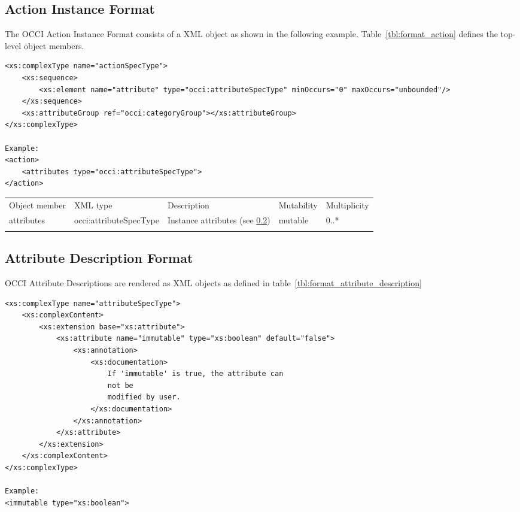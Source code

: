 \documentclass[10pt,a4paper]{article}
\begin{document}
\subsection{Action Instance Format}
\label{sec:format_action}

The OCCI Action Instance Format consists of a XML object as shown in the
following example.
Table~\ref{tbl:format_action} defines the top-level object members.
\begin{lstlisting}
<xs:complexType name="actionSpecType">
	<xs:sequence>
		<xs:element name="attribute" type="occi:attributeSpecType" minOccurs="0" maxOccurs="unbounded"/>
	</xs:sequence>
	<xs:attributeGroup ref="occi:categoryGroup"></xs:attributeGroup>
</xs:complexType>

Example:
<action>
	<attributes type="occi:attributeSpecType">
</action>
\end{lstlisting}

 {
    \begin{tabularx}{\textwidth}{llXll}
    \toprule
    Object member & XML type & Description & Mutability & Multiplicity \\
    \colrule

    attributes & occi:attributeSpecType & Instance attributes (see
\ref{sec:format_attribute_description}) & mutable & 0..* \\
    \botrule
    \end{tabularx}
}

\subsection{Attribute Description Format}
\label{sec:format_attribute_description}

OCCI Attribute Descriptions are rendered as XML objects as defined in table~\ref{tbl:format_attribute_description}

\begin{lstlisting}
<xs:complexType name="attributeSpecType">
	<xs:complexContent>
		<xs:extension base="xs:attribute">
			<xs:attribute name="immutable" type="xs:boolean" default="false">
				<xs:annotation>
					<xs:documentation>
						If 'immutable' is true, the attribute can
						not be
						modified by user.
					</xs:documentation>
				</xs:annotation>
			</xs:attribute>
		</xs:extension>
	</xs:complexContent>
</xs:complexType>

Example:
<immutable type="xs:boolean">
\end{lstlisting}
\end{document}
